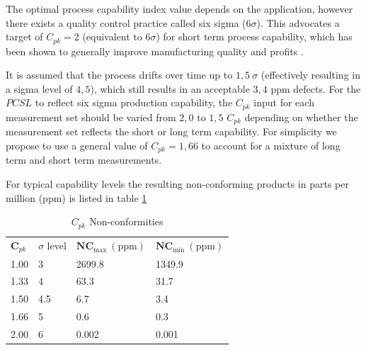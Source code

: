 \documentclass[aip,amsmath, reprint, author-year]{revtex4-1}
\begin{document}
The optimal process capability index value depends on the application, however there exists a quality control practice called six sigma ($6\sigma$).  This advocates a target of $C_{pk} = 2$ (equivalent to $6\sigma$) for short term process capability, which has been shown to generally improve manufacturing quality and profits \cite{koch2004design}.

It is assumed that the process drifts over time up to $1,5 \ \sigma$ (effectively resulting in a sigma level of $4,5$), which still results in an acceptable $3,4$ ppm defects. For the $PCSL$ to reflect six sigma production capability, the $C_{pk}$ input for each measurement set should be varied from $2,0$ to $1,5$ $C_{pk}$ depending on whether the measurement set reflects the short or long term capability. For simplicity we propose to use a general value of $C_{pk} = 1,66$ to account for a mixture of long term and short term measurements. 


For typical capability levels the resulting non-conforming products in parts per million (ppm) is listed in table \ref{tab:cpl_nc}

\begin{table}
\begin{ruledtabular}
\caption{\label{tab:cpl_nc} $C_{pk}$ Non-conformities}
\begin{tabular}{llll}
  $\mathbf{C}_{pk}$	& $\sigma$ level	& $\mathbf{NC_\mathrm{max}} \mathrm{\ (ppm)}$	&  $\mathbf{NC_\mathrm{min}} \mathrm{\ (ppm)}$	\\
  1.00	& 3		& 2699.8		& 1349.9		\\
  1.33 	& 4 		& 63.3		& 31.7 		\\
  1.50 	& 4.5 	& 6.7		& 3.4		\\
  1.66	& 5		& 0.6		& 0.3		\\
  2.00	& 6		& 0.002		& 0.001		\\
\end{tabular}%
\end{ruledtabular}
\end{table}
\end{document}
